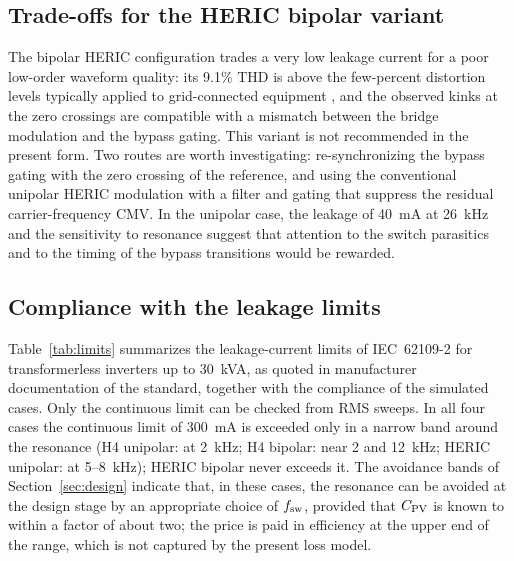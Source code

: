 \subsection{Trade-offs for the HERIC bipolar variant}
The bipolar HERIC configuration trades a very low leakage current for a poor low-order waveform quality: its 9.1\% THD is above the few-percent distortion levels typically applied to grid-connected equipment \cite{IEEE519,IEEE1547}, and the observed kinks at the zero crossings are compatible with a mismatch between the bridge modulation and the bypass gating. This variant is not recommended in the present form. Two routes are worth investigating: re-synchronizing the bypass gating with the zero crossing of the reference, and using the conventional unipolar HERIC modulation with a filter and gating that suppress the residual carrier-frequency CMV. In the unipolar case, the leakage of 40~mA at 26~kHz and the sensitivity to resonance suggest that attention to the switch parasitics and to the timing of the bypass transitions would be rewarded.

\subsection{Compliance with the leakage limits}
Table~\ref{tab:limits} summarizes the leakage-current limits of IEC~62109-2 for transformerless inverters up to 30~kVA, as quoted in manufacturer documentation of the standard, together with the compliance of the simulated cases. Only the continuous limit can be checked from RMS sweeps. In all four cases the continuous limit of 300~mA is exceeded only in a narrow band around the resonance (H4 unipolar: at 2~kHz; H4 bipolar: near 2 and 12~kHz; HERIC unipolar: at 5--8~kHz); HERIC bipolar never exceeds it. The avoidance bands of Section~\ref{sec:design} indicate that, in these cases, the resonance can be avoided at the design stage by an appropriate choice of $f_{\mathrm{sw}}$, provided that $C_{\mathrm{PV}}$ is known to within a factor of about two; the price is paid in efficiency at the upper end of the range, which is not captured by the present loss model.

